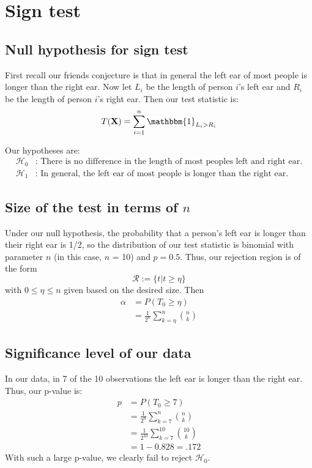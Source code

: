 \documentclass[paper=a4, fontsize=11pt]{scrartcl} %
\numberwithin{equation}{section} %
\numberwithin{figure}{section} %
\numberwithin{table}{section} %
\begin{document}

\section{Sign test}

\subsection{Null hypothesis for sign test}

First recall our friends conjecture is that in general the left ear of most people is longer than the right ear.
Now let $L_i$ be the length of person $i$'s left ear and $R_i$ be the length of person $i$'s right ear. Then our test statistic is:
\[T(\textbf{X}) = \sum_{i=1}^{n} \mathbbm{1}_{L_i > R_i} \]

Our hypotheses are:
\begin{align*}
\mathcal{H}_0&: \textrm{ There is no difference in the length of most peoples left and right ear.} \\
\mathcal{H}_1&:  \textrm{ In general, the left ear of most people is longer than the right ear.}
\end{align*}

\subsection{Size of the test in terms of $n$}

Under our null hypothesis, the probability that a person's left ear is longer than their right ear is 1/2, so the distribution of our test statistic is binomial with parameter $n$ (in this case, $n$ = 10) and $p = 0.5$. Thus, our rejection region is of the form
\[ \mathcal{R} := \{ t | t \geq \eta\}\]
with $0 \leq \eta \leq n$ given based on the desired size. Then
\begin{align*}
\alpha &= P(T_0 \geq \eta)\\
   &= \frac{1}{2^n} \sum_{k = \eta}^n {n \choose k}
\end{align*}

\subsection{Significance level of our data}

In our data, in 7 of the 10 observations the left ear is longer than the right ear. Thus, our p-value is:
\begin{align*}
p &= P(T_0 \geq 7)\\
   &=  \frac{1}{2^n} \sum_{k = 7}^n {n \choose k}\\
   &=  \frac{1}{2^{10}} \sum_{k = 7}^{10} {10 \choose k}\\
   &= 1 - 0.828 = .172
\end{align*}
With such a large p-value, we clearly fail to reject $\mathcal{H}_0$.
\end{document}
